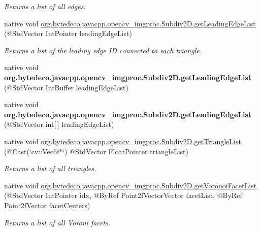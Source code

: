 \begin{DoxyCompactItemize}
\begin{DoxyCompactList}\small\item\em Returns a list of all edges. \end{DoxyCompactList}\item 
native void \hyperlink{group__imgproc_gaf905b455bec0add07a982c747aa0462b}{org.\+bytedeco.\+javacpp.\+opencv\+\_\+imgproc.\+Subdiv2\+D.\+get\+Leading\+Edge\+List} (@Std\+Vector Int\+Pointer leading\+Edge\+List)
\begin{DoxyCompactList}\small\item\em Returns a list of the leading edge ID connected to each triangle. \end{DoxyCompactList}\item 
\mbox{\label{group__imgproc_ga5dd426d3548159a265eead612191d0e9}} 
native void {\bfseries org.\+bytedeco.\+javacpp.\+opencv\+\_\+imgproc.\+Subdiv2\+D.\+get\+Leading\+Edge\+List} (@Std\+Vector Int\+Buffer leading\+Edge\+List)
\item 
\mbox{\label{group__imgproc_gafd08ab27fce167fe6aa9d7da2e3b6218}} 
native void {\bfseries org.\+bytedeco.\+javacpp.\+opencv\+\_\+imgproc.\+Subdiv2\+D.\+get\+Leading\+Edge\+List} (@Std\+Vector int\mbox{[}$\,$\mbox{]} leading\+Edge\+List)
\item 
native void \hyperlink{group__imgproc_ga030c644089d5d56227b9546d06c12dcf}{org.\+bytedeco.\+javacpp.\+opencv\+\_\+imgproc.\+Subdiv2\+D.\+get\+Triangle\+List} (@Cast(\char`\"{}cv\+::\+Vec6f$\ast$\char`\"{}) @Std\+Vector Float\+Pointer triangle\+List)
\begin{DoxyCompactList}\small\item\em Returns a list of all triangles. \end{DoxyCompactList}\item 
native void \hyperlink{group__imgproc_ga3f67d6d59372cbe845eda2627aa4889f}{org.\+bytedeco.\+javacpp.\+opencv\+\_\+imgproc.\+Subdiv2\+D.\+get\+Voronoi\+Facet\+List} (@Std\+Vector Int\+Pointer idx, @By\+Ref Point2f\+Vector\+Vector facet\+List, @By\+Ref Point2f\+Vector facet\+Centers)
\begin{DoxyCompactList}\small\item\em Returns a list of all Voroni facets. \end{DoxyCompactList}\item 
\mbox{\label{group__imgproc_gaff0d60b428566a0c11806ee9d5c37aa7}} 

\end{DoxyCompactItemize}
